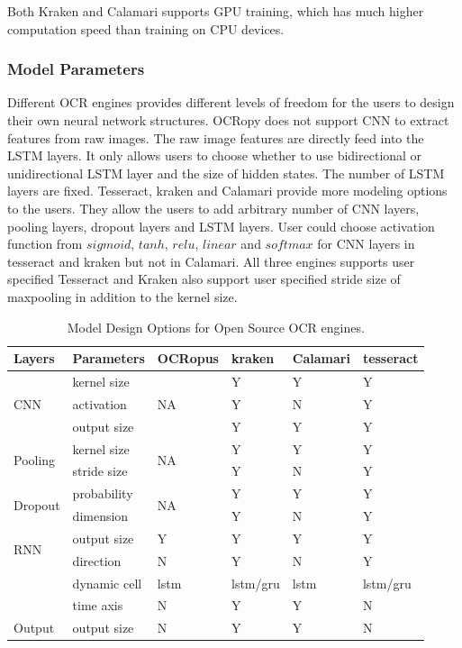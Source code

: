 \documentclass[conference]{IEEEtran}
\begin{document}
Both Kraken and Calamari supports GPU training, which has much higher computation speed than training on CPU devices. 

\subsubsection*{Model Parameters}

Different OCR engines provides different levels of freedom for the users to    
design their own neural network structures. OCRopy does not support CNN to     
extract features from raw images. The raw image features are directly feed into
the LSTM layers. It only allows users to choose whether to use bidirectional or
unidirectional LSTM layer and the size of hidden states. The number of LSTM    
layers are fixed. Tesseract, kraken and Calamari provide more modeling options
to the users. They allow the users to add arbitrary number of CNN layers,
pooling layers, dropout layers and LSTM layers. User could choose activation
function from $sigmoid$, $tanh$, $relu$, $linear$ and $softmax$ for CNN layers
in tesseract and kraken but not in Calamari. All three engines supports user
specified  Tesseract and Kraken also support user specified stride size of
maxpooling in addition to the kernel size.

\begin{table}[bt]
\begin{tabular}{llllll}
\hline
Layers   &Parameters & OCRopus     & kraken                      & Calamari & tesseract\\ \hline
\multirow{ 3}{*}{CNN} & kernel size & \multirow{ 3}{*}{NA} & Y & Y & Y  \\
& activation &  & Y & N & Y \\
& output size & & Y & Y &  Y\\\hline
\multirow{2}{*}{Pooling} &kernel size & \multirow{2}{*}{NA} &  Y & Y & Y \\
& stride size &  & Y & N & Y \\\hline
\multirow{2}{*}{Dropout} &probability & \multirow{2}{*}{NA} &  Y & Y & Y\\
&dimension &  & Y & N & Y \\\hline
\multirow{2}{*}{RNN} & output size & Y &  Y & Y & Y\\
& direction & N & Y & N & Y \\
& dynamic cell & lstm & lstm/gru & lstm & lstm/gru\\
& time axis& N & Y & Y & N \\\hline
Output & output size& N & Y & Y & N \\
\end{tabular}
\caption{Model Design Options for Open Source OCR engines.}
\label{tab:model_param1}
\end{table}
\end{document}
